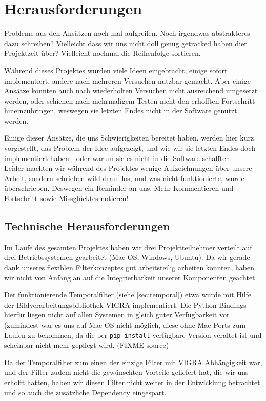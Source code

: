 \documentclass[12pt,a4paper,ngerman]{scrartcl}
\begin{document}
\section{Herausforderungen}

{\color{red}Probleme aus den Ansätzen noch mal aufgreifen. Noch irgendwas abstrakteres dazu schreiben? Vielleicht dass wir uns nicht doll genug getracked haben dier Projektzeit über? Vielleicht nochmal die Reihenfolge sortieren.}

Während dieses Projektes wurden viele Ideen eingebracht, einige sofort implementiert, andere nach mehreren Versuchen nutzbar gemacht. Aber einige Ansätze konnten auch nach wiederholten Versuchen nicht ausreichend umgesetzt werden, oder schienen nach mehrmaligem Testen nicht den erhofften Fortschritt hineinzubringen, weswegen sie letzten Endes nicht in der Software genutzt werden.

Einige dieser Ansätze, die uns Schwierigkeiten bereitet haben, werden hier kurz vorgestellt, das Problem der Idee aufgezeigt, und wie wir sie letzten Endes doch implementiert haben - oder warum sie es nicht in die Software schafften.\\
Leider machten wir während des Projektes wenige Aufzeichnungen über unsere Arbeit, sondern schrieben wild drauf los, und was nicht funktionierte, wurde überschrieben. Deswegen ein Reminder an uns: Mehr Kommentieren und Fortschritt sowie Missglücktes notieren!


\subsection{Technische Herausforderungen}

Im Laufe des gesamten Projektes haben wir drei Projektteilnehmer verteilt auf drei
Betriebssystemen gearbeitet (Mac OS, Windows, Ubuntu). Da wir gerade dank
unseres flexiblen Filterkonzeptes gut arbeitsteilig arbeiten konnten, haben wir
nicht von Anfang an auf die Integrierbarkeit unserer Komponenten geachtet.

Der funktionierende Temporalfilter (siehe \ref{sec:temporal}) etwa wurde mit Hilfe
der Bildverarbeitungsbibliothek VIGRA\cite{vigra} implementiert. Die
Python-Bindings hierfür liegen nicht auf allen Systemen in gleich guter Verfügbarkeit
vor (zumindest war es uns auf Mac OS nicht möglich, diese ohne Mac Ports zum Laufen
zu bekommen, da die per \lstinline{pip install} verfügbare Version veraltet ist und
scheinbar nicht mehr gepflegt wird. (FIXME source)

Da der Temporalfilter zum einen der einzige Filter mit VIGRA Abhängigkeit war, und
der Filter zudem nicht die gewünschten Vorteile geliefert hat, die wir uns erhofft
hatten, haben wir diesen Filter nicht weiter in der Entwicklung betrachtet und so
auch die zusätzliche Dependency eingespart.
\end{document}
